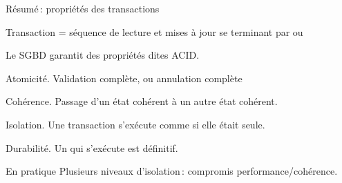 \begin{frame}{Résumé\,: propriétés des transactions}

Transaction = séquence de lecture et mises à jour 
 se terminant par  ou 

\vfill

Le SGBD 
garantit des propriétés dites ACID.

\begin{redbullet}

  \item  \alert{Atomicité}. Validation complète, ou annulation complète
  
  \item  \alert{Cohérence}. Passage d'un état cohérent à un autre état cohérent.
  
  \item \alert{Isolation}. Une transaction s'exécute comme si elle était seule.
  
   \item \alert{Durabilité}. Un   qui s'exécute est  définitif.
\end{redbullet}

\vfill

\begin{block}{\alert{En pratique}}
Plusieurs niveaux d'isolation\,: compromis performance/cohérence.
\end{block}
\end{frame}
